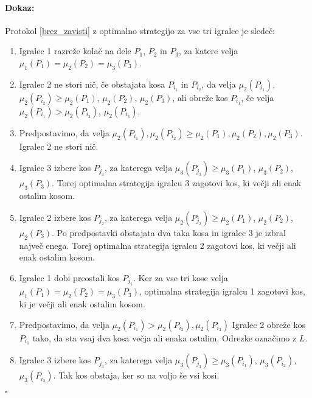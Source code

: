 \documentclass[a4paper, 12pt]{article}
\newenvironment{dokaz}{\paragraph{Dokaz:}}{\hfill$\square$\\}
\begin{document}
	\begin{dokaz}
		Protokol \ref{brez_zavisti} z optimalno strategijo za vse tri igralce je sledeč:
		\begin{enumerate}
			
			\item Igralec 1 razreže kolač na dele $P_1$, $P_2$ in $P_3$, za katere velja $\mu_1 (P_1) = \mu_2 (P_2) = \mu_3 (P_3)$.
			
			\item Igralec 2 ne stori nič, če obstajata kosa $P_{i_1}$ in $P_{i_2}$, da velja $\mu_2 (P_{i_1})$, $\mu_2 (P_{i_2}) \geq \mu_2 (P_1)$, $\mu_2 (P_2)$, $\mu_2 (P_3)$, ali obreže kos $P_{i_1}$, če velja $\mu_2 (P_{i_1}) > \mu_2 (P_{i_2})$, $\mu_2 (P_{i_3})$.
			
			\item[] Predpostavimo, da velja $\mu_2 (P_{i_1}), \mu_2 (P_{i_2}) \geq \mu_2 (P_1), \mu_2 (P_2), \mu_2 (P_3)$. Igralec 2 ne stori nič.
			
			\item \qquad Igralec 3 izbere kos $P_{j_3}$, za katerega velja $\mu_3 (P_{j_3}) \geq \mu_3 (P_1)$, $\mu_3 (P_2)$, $\mu_3 (P_3)$. Torej optimalna strategija igralcu 3 zagotovi kos, ki večji ali enak ostalim kosom.
			
			\item \qquad Igralec 2 izbere kos $P_{j_2}$, za katerega velja $\mu_2 (P_{j_2}) \geq \mu_2 (P_1)$, $\mu_2 (P_2)$, $\mu_2 (P_3)$. Po predpostavki obstajata dva taka kosa in igralec 3 je izbral največ enega. Torej optimalna strategija igralcu 2 zagotovi kos, ki večji ali enak ostalim kosom.
			
			\item \qquad Igralec 1 dobi preostali kos $P_{j_1}$. Ker za vse tri kose velja $\mu_1 (P_1) = \mu_2 (P_2) = \mu_3 (P_3)$, optimalna strategija igralcu 1 zagotovi kos, ki je večji ali enak ostalim kosom.
			
			\item[] Predpostavimo, da velja $\mu_2 (P_{i_1}) > \mu_2 (P_{i_2}), \mu_2 (P_{i_3})$ Igralec 2 obreže kos $P_{i_1}$ tako, da sta vsaj dva kosa večja ali enaka ostalim. Odrezke označimo z $L$.
			
			\setcounter{enumi}{2}
			
			\item \qquad Igralec 3 izbere kos $P_{j_3}$, za katerega velja $\mu_3 (P_{j_3}) \geq \mu_3 (P_{i_1})$, $\mu_3 (P_{i_2})$, $\mu_3 (P_{i_3})$. Tak kos obstaja, ker so na voljo še vsi kosi.
			

\end{enumerate}
\end{dokaz}
\end{document}
